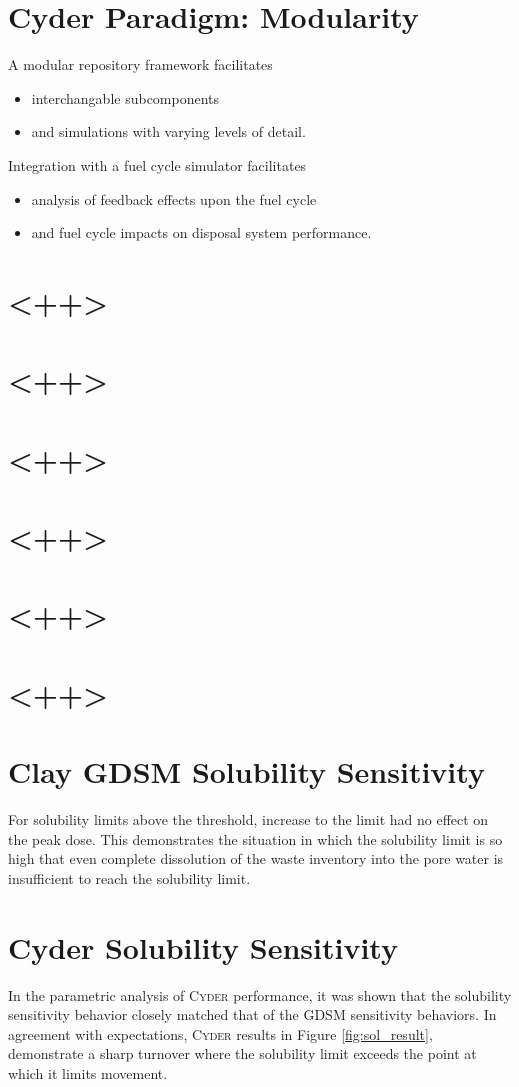\documentclass[letterpaper]{article}
\newcommand{\Cyder}{\textsc{Cyder}\xspace}
\begin{document}
\section*{Cyder Paradigm: Modularity}
A modular repository framework facilitates
\begin{itemize}
\item interchangable subcomponents
\item and simulations with varying levels of detail.
\end{itemize}
Integration with a fuel cycle simulator facilitates
\begin{itemize}
\item analysis of feedback effects upon the fuel cycle
\item and fuel cycle impacts on disposal system performance.
\end{itemize}

\section*{<++>}
\section*{<++>}
\section*{<++>}
\section*{<++>}
\section*{<++>}
\section*{<++>}
\section*{Clay GDSM Solubility Sensitivity}
For solubility limits above the threshold, increase to the limit had no effect on the peak dose. This demonstrates the 
situation in which the solubility limit is so high that even complete 
dissolution of the waste inventory into the pore water is insufficient to reach 
the solubility limit.
\section*{Cyder Solubility Sensitivity}
In the parametric analysis of \Cyder performance, it was shown that the 
solubility sensitivity behavior closely matched that of the GDSM 
sensitivity behaviors. In agreement with expectations, \Cyder results in Figure 
\ref{fig:sol_result}, demonstrate a sharp turnover 
where the solubility limit exceeds the point at which it limits movement. 
\end{document}
